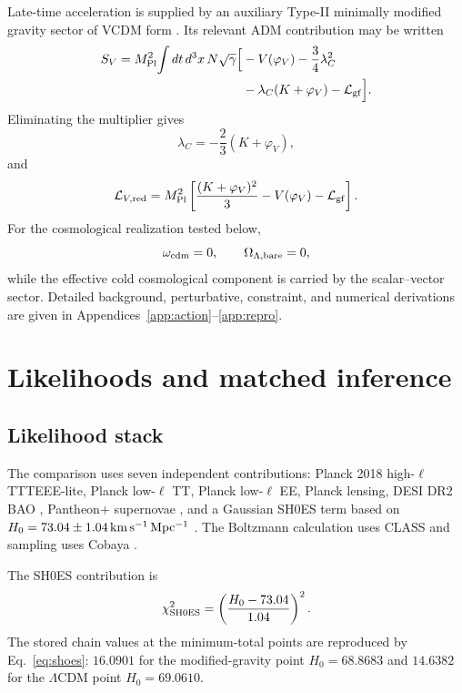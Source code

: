 \documentclass[aps,prd,twocolumn,superscriptaddress,nofootinbib,longbibliography,floatfix]{revtex4-2}
\newcommand{\LCDM}{\Lambda\mathrm{CDM}}
\newcommand{\mpl}{M_{\rm Pl}}
\begin{document}
Late-time acceleration is supplied by an auxiliary Type-II minimally modified gravity sector of VCDM form \cite{DeFeliceMukohyamaPookkillath2021,DeFeliceMaedaMukohyamaPookkillath2022,GanzMartensMukohyamaNamba2023,AkarsuEtAl2024VCDM,AkarsuEtAl2026VCDM}. Its relevant ADM contribution may be written
\begin{align}
S_V=\mpl^2\!\int dt\,d^3x\,N\sqrt{\gamma}\Big[&-V(\varphi_V)-\frac34\lambda_C^2\nonumber\\
&-\lambda_C(K+\varphi_V)-\mathcal L_{\rm gf}\Big].
\label{eq:vcdm-aux}
\end{align}
Eliminating the multiplier gives
\begin{equation}
\lambda_C=-\frac23(K+\varphi_V),
\end{equation}
and
\begin{equation}
\mathcal L_{V,\rm red}=\mpl^2\left[\frac{(K+\varphi_V)^2}{3}-V(\varphi_V)-\mathcal L_{\rm gf}\right].
\label{eq:vcdm-red}
\end{equation}
For the cosmological realization tested below,
\begin{equation}
\omega_{\rm cdm}=0,\qquad \Omega_{\Lambda,\rm bare}=0,
\end{equation}
while the effective cold cosmological component is carried by the scalar--vector sector. Detailed background, perturbative, constraint, and numerical derivations are given in Appendices~\ref{app:action}--\ref{app:repro}.

\section{Likelihoods and matched inference}\label{sec:methods}
\subsection{Likelihood stack}
The comparison uses seven independent contributions: Planck 2018 high-$\ell$ TTTEEE-lite, Planck low-$\ell$ TT, Planck low-$\ell$ EE, Planck lensing, DESI DR2 BAO \cite{DESIDR2II2025}, Pantheon+ supernovae \cite{Brout2022,Scolnic2022}, and a Gaussian SH0ES term based on $H_0=73.04\pm1.04\,{\rm km\,s^{-1}\,Mpc^{-1}}$ \cite{Riess2022}. The Boltzmann calculation uses CLASS \cite{Lesgourgues2011CLASS,Blas2011CLASS} and sampling uses Cobaya \cite{TorradoLewis2021}.

The SH0ES contribution is
\begin{equation}
\chi^2_{\rm SH0ES}=\left(\frac{H_0-73.04}{1.04}\right)^2.
\label{eq:shoes}
\end{equation}
The stored chain values at the minimum-total points are reproduced by Eq.~\eqref{eq:shoes}: $16.0901$ for the modified-gravity point $H_0=68.8683$ and $14.6382$ for the $\LCDM$ point $H_0=69.0610$.
\end{document}
